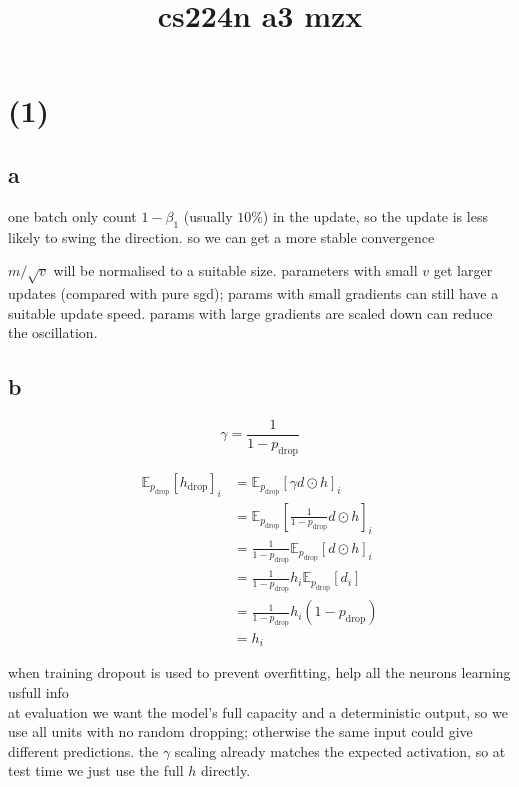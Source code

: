 \documentclass[12pt]{article}
\begin{document}
\title{cs224n a3 mzx}
\maketitle

\section*{(1)}
\subsection*{a}
\noindent \textbf{}
one batch only count $1-\beta_1$ (usually $10\%$) in the update, so the update is less likely to swing the direction. so we can get a more stable convergence

\noindent \textbf{}
$m/\sqrt{v}$ will be normalised to a suitable size. parameters with small $v$ get larger updates (compared with pure sgd); params with small gradients can still have a suitable update speed. params with large gradients are scaled down can reduce the oscillation.

\subsection*{b}

\noindent \textbf{}
\[
\gamma = \frac{1}{1- p_{\mathrm{drop}}}
\]

\begin{align*}
\mathbb{E}_{p_{\mathrm{drop}}}[h_{\mathrm{drop}}]_i
&= \mathbb{E}_{p_{\mathrm{drop}}}[\gamma d \odot h]_i\\
&= \mathbb{E}_{p_{\mathrm{drop}}} [\frac{1}{1- p_{\mathrm{drop}}} d \odot h]_i\\
&= \frac{1}{1- p_{\mathrm{drop}}}  \mathbb{E}_{p_{\mathrm{drop}}} [d \odot h]_i \\
&= \frac{1}{1- p_{\mathrm{drop}}} h_i  \mathbb{E}_{p_{\mathrm{drop}}}[d_i]\\
&= \frac{1}{1- p_{\mathrm{drop}}}  h_i  (1- p_{\mathrm{drop}}) \\
&= h_i
\end{align*}
\noindent \textbf{}

when training dropout is used to prevent overfitting, help all the neurons learning usfull info\\

at evaluation we want the model's full capacity and a deterministic output, so we use all units with no random dropping; otherwise the same input could give different
predictions. the $\gamma$ scaling already matches the expected activation, so at test time we just use the full $h$ directly.
\end{document}
